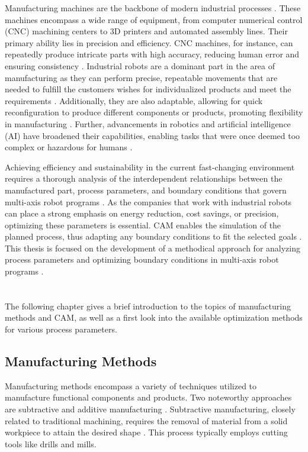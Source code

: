 \documentclass[ZLstudentexpose%
              ,optBiber%
              ,optEnglish%
              ,10pt
              ]{ZLlatex}%
\begin{document}
Manufacturing machines are the backbone of modern industrial processes \cite{Bi.2020}. These machines encompass a wide range of equipment, from computer numerical control (CNC) machining centers to 3D printers and automated assembly lines. Their primary ability lies in precision and efficiency. CNC machines, for instance, can repeatedly produce intricate parts with high accuracy, reducing human error and ensuring consistency \cite{Jia.2018}. \newline
Industrial robots are a dominant part in the area of manufacturing as they can perform precise, repeatable movements that are needed to fulfill the customers wishes for individualized products and meet the requirements \cite{Sherwani.2020}. Additionally, they are also adaptable, allowing for quick reconfiguration to produce different components or products, promoting flexibility in manufacturing \cite{Billard.2019}. Further, advancements in robotics and artificial intelligence (AI) have broadened their capabilities, enabling tasks that were once deemed too complex or hazardous for humans \cite{Goel.2020}. \newline

Achieving efficiency and sustainability in the current fast-changing environment requires a thorough analysis of the interdependent relationships between the manufactured part, process parameters, and boundary conditions that govern multi-axis robot programs \cite{Pan}. As the companies that work with industrial robots can place a strong emphasis on energy reduction, cost savings, or precision, optimizing these parameters is essential. CAM enables the simulation of the planned process, thus adapting any boundary conditions to fit the selected goals \cite{Kyratsis.2020,Maiti.2017}.
This thesis is focused on the development of a methodical approach for analyzing process parameters and optimizing boundary conditions in multi-axis robot programs \cite{Pan}. 

\section{}%
The following chapter gives a brief introduction to the topics of manufacturing methods and CAM, as well as a first look into the available optimization methods for various process parameters. 
\subsection{Manufacturing Methods}
Manufacturing methods encompass a variety of techniques utilized to manufacture functional components and products. Two noteworthy approaches are subtractive and additive manufacturing \cite{Iqbal.2020}. Subtractive manufacturing, closely related to traditional machining, requires the removal of material from a solid workpiece to attain the desired shape \cite{Watson.2015}. This process typically employs cutting tools like drills and mills.
\end{document}
